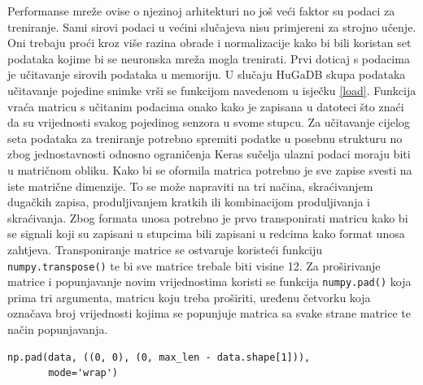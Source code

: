 \documentclass[times, utf8, diplomski]{fer}
\begin{document}
Performanse mreže ovise o njezinoj arhitekturi no još veći faktor su podaci za treniranje. Sami sirovi podaci
u većini slučajeva nisu primjereni za strojno učenje. Oni trebaju proći kroz više razina
obrade i normalizacije kako bi bili koristan set podataka kojime bi se neuronska mreža mogla trenirati.
Prvi doticaj s podacima je učitavanje sirovih podataka u memoriju. U slučaju HuGaDB skupa podataka učitavanje
pojedine snimke vrši se funkcijom navedenom u isječku \ref{load}. Funkcija vraća matricu s učitanim podacima
onako kako je zapisana u datoteci što znaći da su vrijednosti svakog pojedinog senzora u svome stupcu.
Za učitavanje cijelog seta podataka za treniranje potrebno spremiti podatke u posebnu strukturu no zbog
jednostavnosti odnosno ograničenja Keras sučelja ulazni podaci moraju biti u matričnom obliku.
Kako bi se oformila matrica potrebno je sve zapise svesti na iste matrične dimenzije.
To se može napraviti na tri načina, skraćivanjem dugačkih zapisa, produljivanjem kratkih ili kombinacijom
produljivanja i skraćivanja. Zbog formata unosa potrebno je prvo transponirati matricu kako bi se signali
koji su zapisani u stupcima bili zapisani u redcima kako format unosa zahtjeva. Transponiranje matrice
se ostvaruje koristeći funkciju \texttt{numpy.transpose()} te bi sve matrice trebale biti visine 12.
Za proširivanje matrice i popunjavanje novim vrijednostima koristi se funkcija \texttt{numpy.pad()}
koja prima tri argumenta, matricu koju treba proširiti, uređenu četvorku koja označava broj vrijednosti
kojima se popunjuje matrica sa svake strane matrice te način popunjavanja.

\begin{lstlisting}[caption=Proširivanje matrice]
np.pad(data, ((0, 0), (0, max_len - data.shape[1])),
       mode='wrap')
\end{lstlisting}
\end{document}
